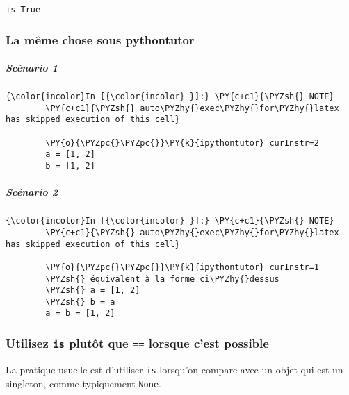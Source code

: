     \begin{Verbatim}[commandchars=\\\{\}]
is True

    \end{Verbatim}

    \hypertarget{la-muxeame-chose-sous-pythontutor}{%
\subsubsection{La même chose sous
pythontutor}\label{la-muxeame-chose-sous-pythontutor}}

    \hypertarget{scuxe9nario-1}{%
\subparagraph{Scénario 1}\label{scuxe9nario-1}}

    \begin{Verbatim}[commandchars=\\\{\}]
{\color{incolor}In [{\color{incolor} }]:} \PY{c+c1}{\PYZsh{} NOTE}
        \PY{c+c1}{\PYZsh{} auto\PYZhy{}exec\PYZhy{}for\PYZhy{}latex has skipped execution of this cell}
        
        \PY{o}{\PYZpc{}\PYZpc{}}\PY{k}{ipythontutor} curInstr=2
        a = [1, 2]
        b = [1, 2]
\end{Verbatim}


    \hypertarget{scuxe9nario-2}{%
\subparagraph{Scénario 2}\label{scuxe9nario-2}}

    \begin{Verbatim}[commandchars=\\\{\}]
{\color{incolor}In [{\color{incolor} }]:} \PY{c+c1}{\PYZsh{} NOTE}
        \PY{c+c1}{\PYZsh{} auto\PYZhy{}exec\PYZhy{}for\PYZhy{}latex has skipped execution of this cell}
        
        \PY{o}{\PYZpc{}\PYZpc{}}\PY{k}{ipythontutor} curInstr=1
        \PYZsh{} équivalent à la forme ci\PYZhy{}dessus
        \PYZsh{} a = [1, 2]
        \PYZsh{} b = a
        a = b = [1, 2]
\end{Verbatim}


    \hypertarget{utilisez-is-plutuxf4t-que-lorsque-cest-possible}{%
\subsubsection{\texorpdfstring{Utilisez \texttt{is} plutôt que
\texttt{==} lorsque c'est
possible}{Utilisez is plutôt que == lorsque c'est possible}}\label{utilisez-is-plutuxf4t-que-lorsque-cest-possible}}

    La pratique usuelle est d'utiliser \texttt{is} lorsqu'on compare avec un
objet qui est un singleton, comme typiquement \texttt{None}.

